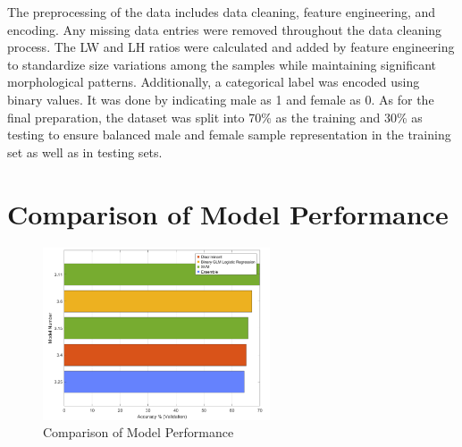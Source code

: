 \begin{table}[H]
	\centering
	\caption{ Descriptive statistics of the T. granosa features}
	\label{tab:descriptive-stat}
\end{table}

The preprocessing of the data includes data cleaning, feature engineering, and encoding. Any missing data entries were removed throughout the data cleaning process. The LW and LH ratios were calculated and added by feature engineering to standardize size variations among the samples while maintaining significant morphological patterns. Additionally, a categorical label was encoded using binary values. It was done by indicating male as 1 and female as 0. As for the final preparation, the dataset was split into 70\% as the training and 30\% as testing to ensure balanced male and female sample representation in the training set as well as in testing sets.

\section{Comparison of Model Performance}
\begin{figure}[!htbp]
	\centering
	\includegraphics[width=0.6\textwidth]{figures/compare-models.png}
	\caption{Comparison of Model Performance}
	\label{fig:compare-models}
\end{figure}

